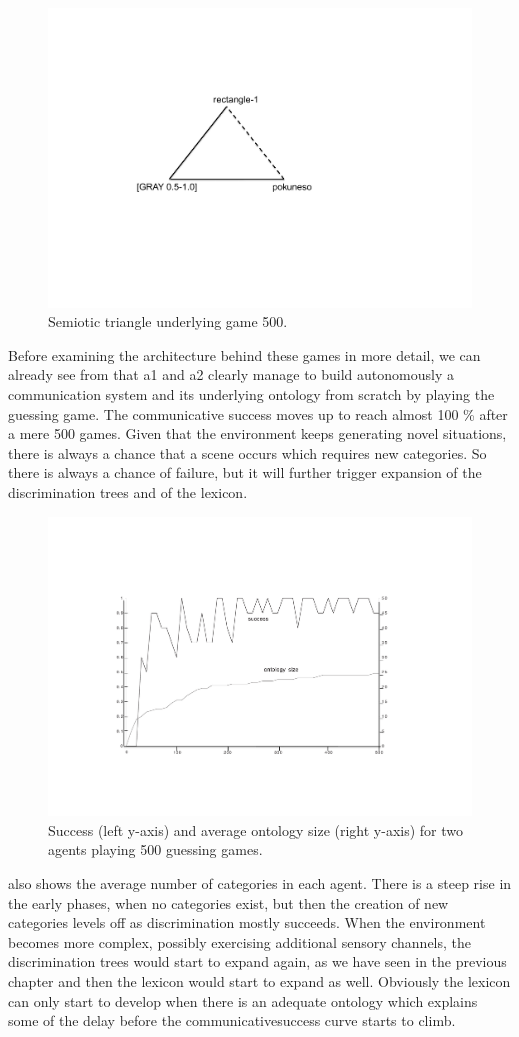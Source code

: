 \begin{figure}[htbp]
  \centerline{\includegraphics[width=.45\textwidth]{chap6/figs/triangle2}}
\caption{\label{triangle2} Semiotic triangle 
underlying game 500.}
\end{figure}

Before examining the architecture behind these
games in more detail, we can 
already see from  that
{\bfshape  a1} and {\bfshape  a2} clearly manage to build autonomously 
a communication system and its underlying ontology
from scratch by playing the 
guessing game. The communicative success 
moves up to reach almost 100 \% after a mere 500 games. 
Given that the environment keeps generating novel 
situations, there is always a chance that a 
scene occurs which requires new categories. So there 
is always a chance of failure, but it will 
further trigger expansion of the discrimination 
trees and of the lexicon. 


\begin{figure}[htbp]
  \centerline{\includegraphics[width=.70\textwidth]{chap6/figs/gsucc1}}
\caption{\label{gsuccess1} Success 
(left y-axis) and average ontology size
(right y-axis) for two agents playing 500
guessing games.} 
\end{figure}
 also shows the average 
number of categories in each agent. There is a 
steep rise in the early phases, when no categories
exist, but then the creation of new categories levels 
off as discrimination mostly succeeds. When the 
environment becomes more complex, possibly exercising
additional sensory channels, the discrimination
trees would start to expand again, as we have seen 
in the previous chapter and then the lexicon 
would start to expand as well. Obviously the lexicon can only 
start to develop when there is an adequate ontology which 
explains some of the delay before the communicativesuccess curve starts to climb. 

